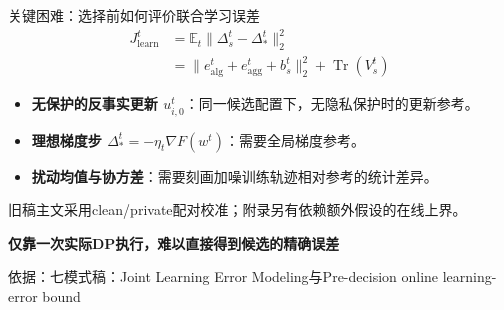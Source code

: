 \documentclass[aspectratio=169,11pt]{beamer}
\newcommand{\src}[1]{\vfill{\color{Gray}\fontsize{7.5}{9}\selectfont 依据：#1\par}}
\newcommand{\msg}[1]{\par\vspace{.14cm}{\color{Teal}\rule{.32cm}{1.5pt}}\hspace{.18cm}\textbf{#1}\par}
\begin{document}
\begin{frame}{关键困难：选择前如何评价联合学习误差}
\[
\begin{aligned}
J_{\mathrm{learn}}^t
&=\mathbb E_t\|\Delta_s^t-\Delta_*^t\|_2^2\\
&=\|e_{\mathrm{alg}}^t+e_{\mathrm{agg}}^t+b_s^t\|_2^2
+\operatorname{Tr}(V_s^t)
\end{aligned}
\]
\begin{itemize}\setlength{\itemsep}{.14cm}
\item \textbf{无保护的反事实更新 $u_{i,0}^t$}：同一候选配置下，无隐私保护时的更新参考。
\item \textbf{理想梯度步 $\Delta_*^t=-\eta_t\nabla F(w^t)$}：需要全局梯度参考。
\item \textbf{扰动均值与协方差}：需要刻画加噪训练轨迹相对参考的统计差异。
\end{itemize}
\par\vspace{.10cm}
{\small 旧稿主文采用clean/private配对校准；附录另有依赖额外假设的在线上界。}
\msg{仅靠一次实际DP执行，难以直接得到候选的精确误差}
\src{七模式稿：Joint Learning Error Modeling与Pre-decision online learning-error bound}
\end{frame}
\end{document}
